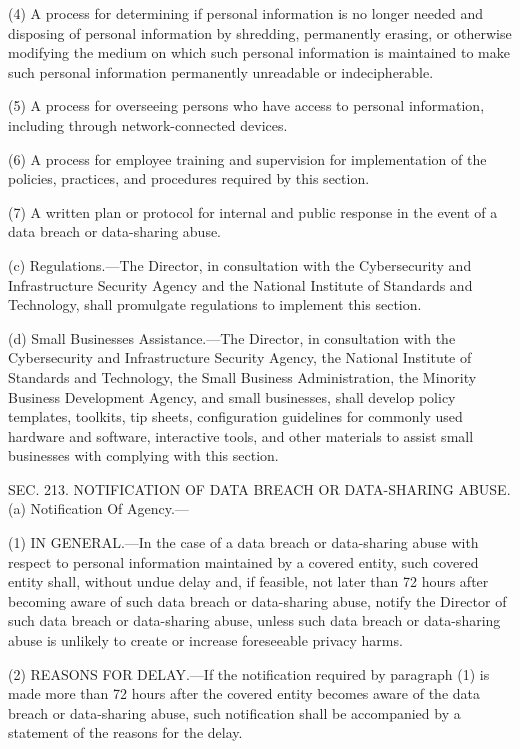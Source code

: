 (4) A process for determining if personal information is no longer needed and disposing of personal information by shredding, permanently erasing, or otherwise modifying the medium on which such personal information is maintained to make such personal information permanently unreadable or indecipherable.

(5) A process for overseeing persons who have access to personal information, including through network-connected devices.

(6) A process for employee training and supervision for implementation of the policies, practices, and procedures required by this section.

(7) A written plan or protocol for internal and public response in the event of a data breach or data-sharing abuse.

(c) Regulations.—The Director, in consultation with the Cybersecurity and Infrastructure Security Agency and the National Institute of Standards and Technology, shall promulgate regulations to implement this section.

(d) Small Businesses Assistance.—The Director, in consultation with the Cybersecurity and Infrastructure Security Agency, the National Institute of Standards and Technology, the Small Business Administration, the Minority Business Development Agency, and small businesses, shall develop policy templates, toolkits, tip sheets, configuration guidelines for commonly used hardware and software, interactive tools, and other materials to assist small businesses with complying with this section.


SEC. 213. NOTIFICATION OF DATA BREACH OR DATA-SHARING ABUSE.
(a) Notification Of Agency.—

(1) IN GENERAL.—In the case of a data breach or data-sharing abuse with respect to personal information maintained by a covered entity, such covered entity shall, without undue delay and, if feasible, not later than 72 hours after becoming aware of such data breach or data-sharing abuse, notify the Director of such data breach or data-sharing abuse, unless such data breach or data-sharing abuse is unlikely to create or increase foreseeable privacy harms.

(2) REASONS FOR DELAY.—If the notification required by paragraph (1) is made more than 72 hours after the covered entity becomes aware of the data breach or data-sharing abuse, such notification shall be accompanied by a statement of the reasons for the delay.

